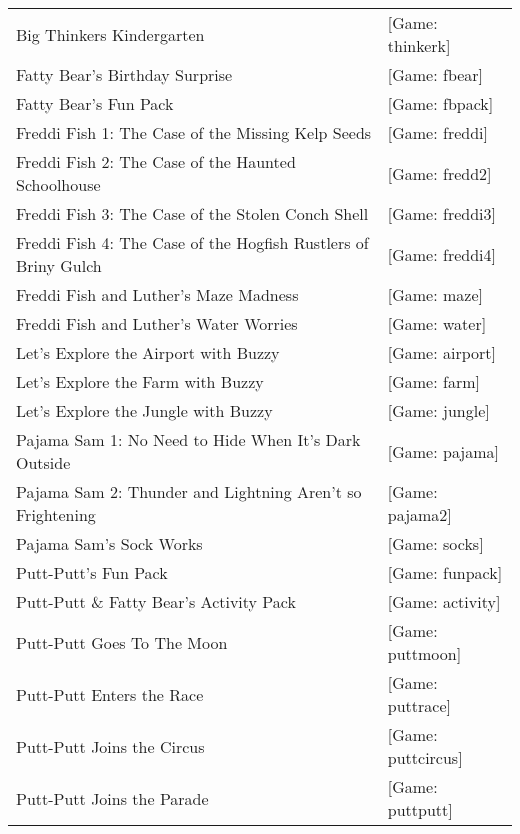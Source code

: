 \begin{itemize}
\begin{tabular}[h]{ll}
    Big Thinkers Kindergarten&                                     [Game: thinkerk]\\
    Fatty Bear's Birthday Surprise&                                [Game: fbear]\\
    Fatty Bear's Fun Pack&                                         [Game: fbpack]\\
    Freddi Fish 1: The Case of the Missing Kelp Seeds&             [Game: freddi]\\
    Freddi Fish 2: The Case of the Haunted Schoolhouse&            [Game: fredd2]\\
    Freddi Fish 3: The Case of the Stolen Conch Shell&             [Game: freddi3]\\
    Freddi Fish 4: The Case of the Hogfish Rustlers of Briny Gulch&[Game: freddi4]\\
    Freddi Fish and Luther's Maze Madness&                         [Game: maze]\\
    Freddi Fish and Luther's Water Worries&                        [Game: water]\\
    Let's Explore the Airport with Buzzy&                          [Game: airport]\\
    Let's Explore the Farm with Buzzy&                             [Game: farm]\\
    Let's Explore the Jungle with Buzzy&                           [Game: jungle]\\
    Pajama Sam 1: No Need to Hide When It's Dark Outside&          [Game: pajama]\\
    Pajama Sam 2: Thunder and Lightning Aren't so Frightening&     [Game: pajama2]\\
    Pajama Sam's Sock Works&                                       [Game: socks]\\
    Putt-Putt's Fun Pack&                                          [Game: funpack]\\
    Putt-Putt \& Fatty Bear's Activity Pack&                       [Game: activity]\\
    Putt-Putt Goes To The Moon&                                    [Game: puttmoon]\\
    Putt-Putt Enters the Race&                                     [Game: puttrace]\\
    Putt-Putt Joins the Circus&                                    [Game: puttcircus]\\
    Putt-Putt Joins the Parade&                                    [Game: puttputt]\\

\end{tabular}
\end{itemize}

